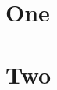 \documentclass{article}
\begin{document}
\begin{abstract}
Abstract text.
\end{abstract}
\tableofcontents
\section{One}
\section{Two}
\end{document}
